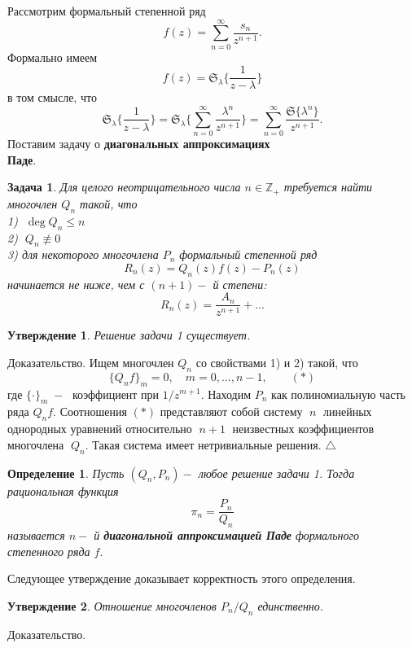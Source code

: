 \documentclass[12 pt, a4 paper]{article}
\theoremstyle{plain}   \newtheorem{Pro}{Задача}
\newtheorem{Sta}{Утверждение}
\newtheorem{Def}{Определение}
\begin{document}
Рассмотрим формальный степенной ряд
$$
  f(z)=\sum _{n=0}^{\infty}
  \frac{s_n }{z^{n+1}}.
$$
Формально имеем
$$
  f(z)=\mathfrak{S}_{\lambda} \biggl \{ \frac{1}{z- \lambda } \biggr \}
$$
в том смысле, что
$$
  \mathfrak{S}_{\lambda} \biggl \{ \frac{1}{z-\lambda} \biggr \}=
  \mathfrak{S}_{\lambda} \biggl \{
  \sum _{n=0}^{\infty}
  \frac{\lambda ^n }{z^{n+1}} \biggr \}=
  \sum _{n=0}^{\infty}
  \frac{\mathfrak{S} \{ \lambda ^n \} }{z^{n+1}}.
$$
Поставим задачу о
{\bfseries диагональных аппроксимациях\\
Паде}.
\begin{Pro}
Для целого неотрицательного числа
$ n \in \mathbb{Z}_+ $
требуется найти многочлен
$ Q_n $
такой, что
\\
1) $ \; \deg Q_n \leq n $\\
2) $ \; Q_n \not \equiv 0 $\\
3) для некоторого многочлена
$ P_n $
формальный степенной ряд
$$
  R_n (z)=Q_n (z) f(z)-P_n (z)
$$
начинается не ниже, чем с
$ (n+1)- $ й степени:
$$
  R_n (z)=\frac{A_n }{z^{n+1}}+...
$$
\end{Pro}
\begin{Sta}
Решение задачи 1 существует.
\end{Sta}
{\Large Доказательство.}
Ищем многочлен
$ Q_n $
со свойствами 1) и 2) такой, что
$$
  \{ Q_n f \} _m =0,
  \quad m=0,...,n-1,
  \qquad (\ast)
$$
где
$ \{ \cdot \} _m \; - \; $
коэффициент при
$ 1/z^{m+1}. $
Находим
$ P_n $
как полиномиальную часть ряда
$ Q_n f .$
Соотношения
$ (\ast) $
представляют собой систему
$ \; n \; $
линейных однородных уравнений относительно
$ \; n+1 \; $
неизвестных коэффициентов многочлена
$ \; Q_n . $
Такая система имеет нетривиальные решения.
$ \triangle $
\begin{Def}
Пусть
$ (Q_n , P_n ) - $
любое решение задачи 1. Тогда рациональная функция
$$
  \pi _n =\frac{ P_n }{Q_n }
$$
называется
$ n- $ й
{\bfseries диагональной аппроксимацией Паде}
формального степенного ряда
$ f . $
\end{Def}
Следующее утверждение доказывает корректность этого определения.
\begin{Sta}
Отношение многочленов
$ P_n /Q_n $
единственно.
\end{Sta}
{\Large Доказательство.}
\end{document}
